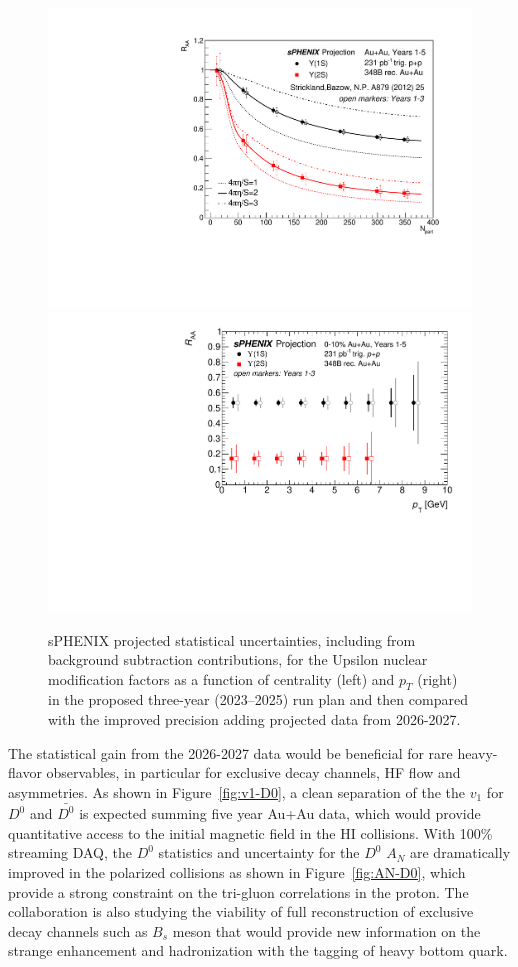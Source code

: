 \begin{figure}
    \centering
    \includegraphics[width=0.44\linewidth]{figs/upsilon_centrality_3yrs_5yrs_comparison.pdf}
    \includegraphics[width=0.47\linewidth]{figs/upsilon_RAA_2}
    \caption{sPHENIX projected statistical uncertainties,  including from background subtraction contributions, for the Upsilon nuclear modification factors as a function of centrality (left) and $p_T$ (right) in the proposed three-year (2023–2025) run plan and then compared with the improved precision adding projected data from 2026-2027.}
    \label{fig:RAA_upsilon_extrayears}
\end{figure}

The statistical gain from the 2026-2027 data would be beneficial for rare heavy-flavor observables, in particular for exclusive decay channels, HF flow and asymmetries. As shown in Figure~\ref{fig:v1-D0}, a clean separation of the the $v_1$ for $D^0$ and $\bar{D^0}$ is expected summing five year Au+Au data, which would provide quantitative access to the initial magnetic field in the HI collisions. With 100\% streaming DAQ, the $D^0$ statistics and uncertainty for the $D^0$ $A_N$ are dramatically improved in the polarized \pp collisions as shown in Figure~\ref{fig:AN-D0}, which provide a strong constraint on the tri-gluon correlations in the proton. 
The collaboration is also studying the viability of full reconstruction of exclusive decay channels such as $B_s$ meson that would provide new information on the strange enhancement and hadronization with the tagging of heavy bottom quark.  
 

